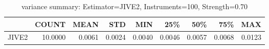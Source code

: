 \begin{table}[ht]
\centering
\caption{variance summary: Estimator=JIVE2, Instruments=100, Strength=0.70}
\begin{tabular}{lrrrrrrrr}
\toprule
 & COUNT & MEAN & STD & MIN & 25\% & 50\% & 75\% & MAX \\
\midrule
JIVE2 & 10.0000 & 0.0061 & 0.0024 & 0.0040 & 0.0046 & 0.0057 & 0.0068 & 0.0123 \\
\bottomrule
\end{tabular}
\end{table}
